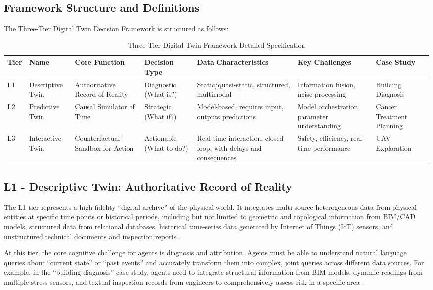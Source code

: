 \subsection{Framework Structure and Definitions}

The Three-Tier Digital Twin Decision Framework is structured as follows:

\begin{table}[h]
\centering
\caption{Three-Tier Digital Twin Framework Detailed Specification}
\label{tab:three_tier_framework}
\begin{tabular}{|p{1.5cm}|p{2.5cm}|p{2.5cm}|p{2cm}|p{2cm}|p{2cm}|p{2cm}|}
\hline
\textbf{Tier} & \textbf{Name} & \textbf{Core Function} & \textbf{Decision Type} & \textbf{Data Characteristics} & \textbf{Key Challenges} & \textbf{Case Study} \\
\hline
L1 & Descriptive Twin & Authoritative Record of Reality & Diagnostic (What is?) & Static/quasi-static, structured, multimodal & Information fusion, noise processing & Building Diagnosis \\
\hline
L2 & Predictive Twin & Causal Simulator of Time & Strategic (What if?) & Model-based, requires input, outputs predictions & Model orchestration, parameter understanding & Cancer Treatment Planning \\
\hline
L3 & Interactive Twin & Counterfactual Sandbox for Action & Actionable (What to do?) & Real-time interaction, closed-loop, with delays and consequences & Safety, efficiency, real-time performance & UAV Exploration \\
\hline
\end{tabular}
\end{table}

\subsection{L1 - Descriptive Twin: Authoritative Record of Reality}

The L1 tier represents a high-fidelity ``digital archive'' of the physical world. It integrates multi-source heterogeneous data from physical entities at specific time points or historical periods, including but not limited to geometric and topological information from BIM/CAD models, structured data from relational databases, historical time-series data generated by Internet of Things (IoT) sensors, and unstructured technical documents and inspection reports \cite{tao2018digital, negri2017review}.

At this tier, the core cognitive challenge for agents is diagnosis and attribution. Agents must be able to understand natural language queries about ``current state'' or ``past events'' and accurately transform them into complex, joint queries across different data sources. For example, in the ``building diagnosis'' case study, agents need to integrate structural information from BIM models, dynamic readings from multiple stress sensors, and textual inspection records from engineers to comprehensively assess risk in a specific area \cite{boje2020towards}.


